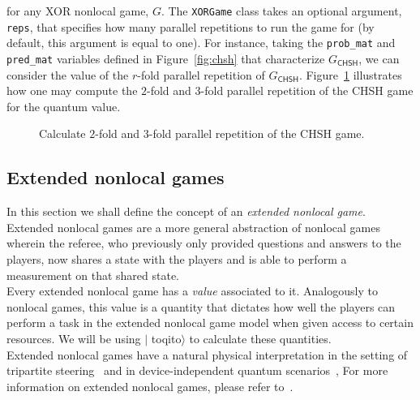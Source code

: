 \documentclass[nofootinbib,superscriptaddress,a4paper,twocolumn,longbibliography,floatfix,pra]{revtex4-2}
\newcommand{\toqitofont}{%
	\fontfamily{FiraSans}%
	\selectfont}
\newcommand{\toqito}{ $|${\toqitofont toqito}$\rangle$\xspace}
\def\CHSH{\mathsf{CHSH}}
\begin{document}
for any XOR nonlocal game, $G$. The \texttt{XORGame} class takes an optional
argument, \texttt{reps}, that specifies how many parallel repetitions to run
the game for (by default, this argument is equal to one). For instance, taking
the \texttt{prob\_mat} and \texttt{pred\_mat} variables defined in
Figure~\ref{fig:chsh} that characterize $G_{\CHSH}$, we can consider the value
of the $r$-fold parallel repetition of $G_{\CHSH}$.
Figure~\ref{fig:chsh_parallel_repetition} illustrates how one may compute the
$2$-fold and $3$-fold parallel repetition of the CHSH game for the quantum
value.

\begin{figure}[!htpb]
    \centering
            
    \caption{Calculate $2$-fold and $3$-fold parallel repetition of the CHSH game.}
    \label{fig:chsh_parallel_repetition}
\end{figure}





\subsection{Extended nonlocal games}
\label{sec:extended_nonlocal_games}

In this section we shall define the concept of an \emph{extended nonlocal
game}. Extended nonlocal games are a more general abstraction of nonlocal games
wherein the referee, who previously only provided questions and answers to the
players, now shares a state with the players and is able to perform a
measurement on that shared state.
\\

Every extended nonlocal game has a \emph{value} associated to it. Analogously
to nonlocal games, this value is a quantity that dictates how well the players
can perform a task in the extended nonlocal game model when given access to
certain resources. We will be using \toqito to calculate these quantities.
\\

Extended nonlocal games have a natural physical interpretation in the setting
of tripartite steering~\cite{cavalcanti2015detection} and in device-independent
quantum scenarios~\cite{tomamichel2013monogamy}, For more information on
extended nonlocal games, please refer to~\cite{johnston2016extended,
russo2017extended, russo2017thesis}.
\end{document}
